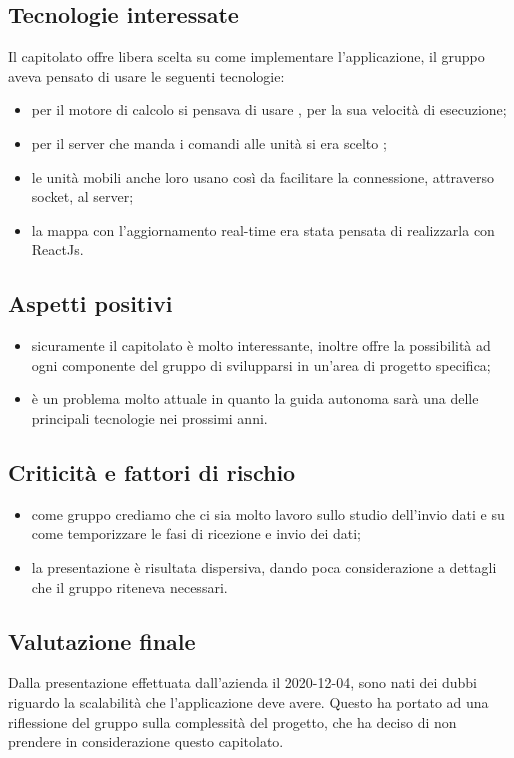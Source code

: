 \subsection{Tecnologie interessate}
Il capitolato offre libera scelta su come implementare l'applicazione, il gruppo aveva pensato di usare le seguenti tecnologie:
\begin{itemize}
\item per il motore di calcolo si pensava di usare , per la sua velocità di esecuzione;
\item per il server che manda i comandi alle unità si era scelto ;
\item le unità mobili anche loro usano  così da facilitare la connessione, attraverso socket, al server;
\item la mappa con l'aggiornamento real-time era stata pensata di realizzarla con ReactJs.
\end{itemize}

\subsection{Aspetti positivi}
\begin{itemize}
\item sicuramente il capitolato è molto interessante, inoltre offre la possibilità ad ogni componente del gruppo di svilupparsi in un'area di progetto specifica;
\item è un problema molto attuale in quanto la guida autonoma sarà una delle principali tecnologie nei prossimi anni.
\end{itemize}

\subsection{Criticità e fattori di rischio}
\begin{itemize}
\item come gruppo crediamo che ci sia molto lavoro sullo studio dell'invio dati e su come temporizzare le fasi di ricezione e invio dei dati;
\item la presentazione è risultata dispersiva, dando poca considerazione a dettagli che il gruppo riteneva necessari.  
\end{itemize}

\subsection{Valutazione finale}
Dalla presentazione effettuata dall'azienda il 2020-12-04, sono nati dei dubbi riguardo la scalabilità che l'applicazione deve avere. Questo ha portato ad una riflessione del gruppo sulla complessità del progetto, che ha deciso di non prendere in considerazione questo capitolato.